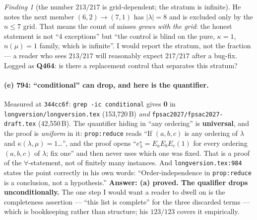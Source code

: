 \documentclass[11pt]{article}
\theoremstyle{remark}
\newtheorem{finding}{Finding}
\begin{document}
\begin{finding}[the number $213/217$ is grid-dependent; the stratum is infinite]
He notes the next member $(6,2)\to(7,1)$ has $|\lambda|=8$ and is excluded only by the $n\le7$
grid. That means the count of misses \emph{grows with the grid}: the honest statement is not
``4 exceptions'' but ``the control is blind on the pure, $\kappa=1$, $n(\mu)=1$ family, which is
infinite''. I would report the stratum, not the fraction --- a reader who sees $213/217$ will
reasonably expect $217/217$ after a bug-fix. Logged as \textbf{Q464}: is there a replacement
control that separates this stratum?
\end{finding}

\paragraph{(e) 794: ``conditional'' can drop, and here is the quantifier.}
Measured at \texttt{344cc6f}: \texttt{grep -ic conditional} gives \textbf{0} in
\texttt{longversion/longversion.tex} (153{,}720\,B) \emph{and}
\texttt{fpsac2027/fpsac2027-draft.tex} (42{,}550\,B). The quantifier hiding in ``any ordering''
is \textbf{universal}, and the proof is \emph{uniform} in it: \texttt{prop:reduce} reads ``If
$(a,b,c)$ is any ordering of $\lambda$ and $\kappa(\lambda,\mu)=1$\dots'', and the proof opens
``$e^\star_\lambda=E_aE_bE_c(1)$ for every ordering $(a,b,c)$ of $\lambda$; fix one'' and then
never uses which one was fixed. That is a proof of the $\forall$-statement, not of finitely many
instances. And \texttt{longversion.tex:984} states the point correctly in his own words:
``Order-independence in \texttt{prop:reduce} is a conclusion, not a hypothesis.''
\textbf{Answer: (a) proved. The qualifier drops unconditionally.} The one step I would want a
reader to dwell on is the completeness assertion --- ``this list is complete'' for the three
discarded terms --- which is bookkeeping rather than structure; his $123/123$ covers it
empirically.
\end{document}
